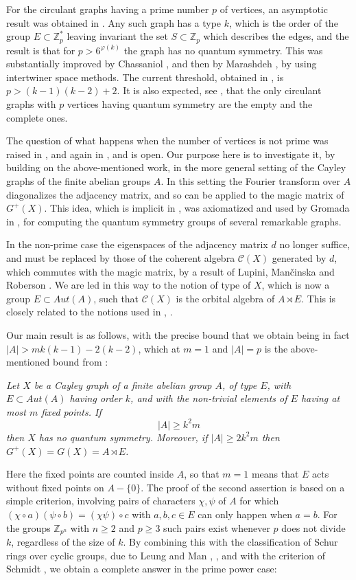 \documentclass[11pt]{amsart}
\newcommand{\C}{\mathcal C}
\newcommand{\Z}{\mathbb Z}
\begin{document}
For the circulant graphs having a prime number $p$ of vertices, an asymptotic result was obtained in \cite{bbc}. Any such graph has a type $k$, which is the order of the group $E\subset\Z_p^*$ leaving invariant the set $S\subset\Z_p$ which describes the edges, and the result is that for $p>6^{\varphi(k)}$ the graph has no quantum symmetry. This was substantially improved by Chassaniol \cite{cha}, and then by Marashdeh \cite{mar}, by using intertwiner space methods. The current threshold, obtained in \cite{mar}, is $p>(k-1)(k-2)+2$. It is also expected, see \cite{mar}, that the only circulant graphs with $p$ vertices having quantum symmetry are the empty and the complete ones.

The question of what happens when the number of vertices is not prime was raised in \cite{bbc}, and again in \cite{mar}, and is open. Our purpose here is to investigate it, by building on the above-mentioned work, in the more general setting of the Cayley graphs of the finite abelian groups $A$. In this setting the Fourier transform over $A$ diagonalizes the adjacency matrix, and so can be applied to the magic matrix of $G^+(X)$. This idea, which is implicit in \cite{bbc}, was axiomatized and used by Gromada in \cite{gro}, for computing the quantum symmetry groups of several remarkable graphs.

In the non-prime case the eigenspaces of the adjacency matrix $d$ no longer suffice, and must be replaced by those of the coherent algebra $\C(X)$ generated by $d$, which commutes with the magic matrix, by a result of Lupini, Man\v{c}inska and Roberson \cite{lmr}. We are led in this way to the notion of type of $X$, which is now a group $E\subset Aut(A)$, such that $\C(X)$ is the orbital algebra of $A\rtimes E$. This is closely related to the notions used in \cite{cha}, \cite{mn}.

Our main result is as follows, with the precise bound that we obtain being in fact $|A|>mk(k-1)-2(k-2)$, which at $m=1$ and $|A|=p$ is the above-mentioned bound from \cite{mar}:

\medskip

 {\em Let $X$ be a Cayley graph of a finite abelian group $A$, of type $E$, with $E\subset Aut(A)$ having order $k$, and with the non-trivial elements of $E$ having at most $m$ fixed points. If
$$|A|\geq k^2m$$
then $X$ has no quantum symmetry. Moreover, if $|A|\geq2k^2m$ then $G^+(X)=G(X)=A\rtimes E$.}

\medskip

Here the fixed points are counted inside $A$, so that $m=1$ means that $E$ acts without fixed points on $A-\{0\}$. The proof of the second assertion is based on a simple criterion, involving pairs of characters $\chi,\psi$ of $A$ for which $(\chi\circ a)(\psi\circ b)=(\chi\psi)\circ c$ with $a,b,c\in E$ can only happen when $a=b$. For the groups $\Z_{p^n}$ with $n\geq2$ and $p\geq3$ such pairs exist whenever $p$ does not divide $k$, regardless of the size of $k$. By combining this with the classification of Schur rings over cyclic groups, due to Leung and Man \cite{lm1}, \cite{lm2}, and with the criterion of Schmidt \cite{sch}, we obtain a complete answer in the prime power case:
\end{document}
